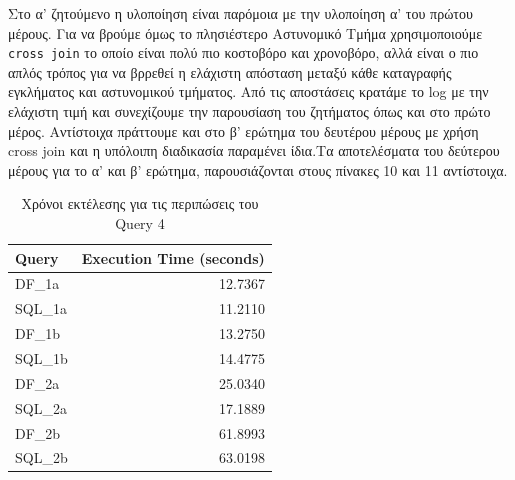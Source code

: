 \documentclass{article}
\begin{document}
Στο α' ζητούμενο η υλοποίηση είναι παρόμοια με την υλοποίηση α' του πρώτου μέρους. Για να βρούμε όμως το πλησιέστερο Αστυνομικό Τμήμα χρησιμοποιούμε \texttt{cross join}  το οποίο είναι πολύ πιο κοστοβόρο και χρονοβόρο, αλλά είναι ο πιο απλός τρόπος για να βρρεθεί η ελάχιστη απόσταση μεταξύ κάθε καταγραφής εγκλήματος και αστυνομικού τμήματος. Από τις αποστάσεις κρατάμε το log  με την ελάχιστη τιμή και συνεχίζουμε την παρουσίαση του ζητήματος όπως και στο πρώτο μέρος. Αντίστοιχα πράττουμε και στο β' ερώτημα του δευτέρου μέρους με χρήση  cross join  και η υπόλοιπη διαδικασία παραμένει ίδια.Τα αποτελέσματα του δεύτερου μέρους για το α' και β' ερώτημα, παρουσιάζονται στους πίνακες 10 και 11 αντίστοιχα.\\






\clearpage
{}
\begin{table}[ht]
\centering
\begin{tabular}{|l|r|}
\hline
\textbf{Query}      & \textbf{Execution Time (seconds)} \\ \hline
DF\_1a        & 12.7367                           \\ \hline
SQL\_1a       & 11.2110                           \\ \hline
DF\_1b        & 13.2750                           \\ \hline
SQL\_1b       & 14.4775                           \\ \hline
DF\_2a        & 25.0340                           \\ \hline
SQL\_2a       & 17.1889                           \\ \hline
DF\_2b        & 61.8993                           \\ \hline
SQL\_2b       & 63.0198                           \\ \hline
\end{tabular}
\caption{Χρόνοι εκτέλεσης για τις περιπώσεις του  Query 4}
\label{table:query4_execution_times}
\end{table}
\end{document}
